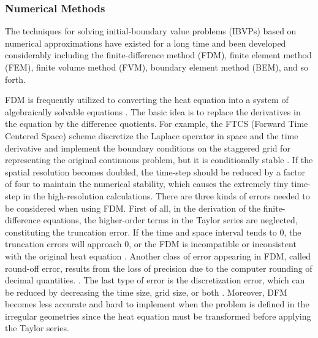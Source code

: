 \subsubsection{Numerical Methods}\label{numerical methods}

The techniques for solving initial-boundary value problems (IBVPs)
based on numerical approximations have existed for a long time and
been developed considerably including the finite-difference method
(FDM), finite element method (FEM), finite volume method (FVM),
boundary element method (BEM), and so forth.


FDM is frequently utilized to converting the heat equation into a
system of algebraically solvable
equations \cite{grossmann2007numerical}. The basic idea is to replace
the derivatives in the equation by the difference quotients. For
example, the FTCS (Forward Time Centered Space)
scheme \cite{pletcher2012computational} discretize the Laplace
operator in space and the time derivative and implement the boundary
conditions on the staggered grid for representing the original
continuous problem, but it is conditionally
stable \cite{pletcher2012computational}. If the spatial resolution
becomes doubled, the time-step should be reduced by a factor of four
to maintain the numerical stability, which causes the extremely tiny
time-step in the high-resolution calculations. There are three kinds
of errors needed to be considered when using FDM. First of all, in the
derivation of the finite-difference equations, the higher-order terms
in the Taylor series are neglected, constituting the truncation
error. If the time and space interval tends to $0$, the truncation
errors will approach $0$, or the FDM is incompatible or inconsistent
with the original heat equation \cite{crank1979mathematics}. Another
class of error appearing in FDM, called round-off error, results from
the loss of precision due to the computer rounding of decimal
quantities. \cite{hoffman2018numerical}. The last type of error is the
discretization error, which can be reduced by decreasing the time
size, grid size, or both \cite{crank1979mathematics}. Moreover, DFM
becomes less accurate and hard to implement when the problem is
defined in the irregular geometries since the heat equation must be
transformed before applying the Taylor series.


